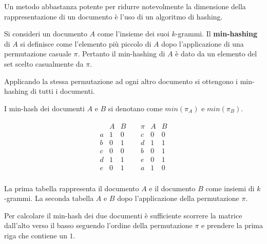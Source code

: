 		Un metodo abbastanza potente per ridurre notevolmente la dimensione della rappresentazione di un documento è l'uso di un algoritmo di hashing.

		Si consideri un documento $A$ come l'insieme dei suoi $k$-grammi. Il \textbf{min-hashing} di $A$ si definisce come l'elemento più piccolo di $A$ dopo l'applicazione di una permutazione casuale $\pi$. Pertanto il min-hashing di $A$ è dato da un elemento del set scelto casualmente da $\pi$. 

		Applicando la stessa permutazione ad ogni altro documento si ottengono i min-hashing di tutti i documenti.

		\clearpage

		\begin{remark}
			I min-hash dei documenti $A$ e $B$ si denotano come $min(\pi_A)$ e $min(\pi_B)$.
		\end{remark}

		\begin{example}\label{ex:pi_perm}
		$$
		\begin{array}{ccc}
			\begin{array}{ccc}
			& A & B \\ \hline
			a & 1 & 0 \\
			b & 0 & 1 \\
			c & 0 & 0 \\
			d & 1 & 1 \\
			e & 0 & 1 \\
			\end{array}
			\ & \
			\begin{array}{ccc}
			\pi & A & B \\ \hline
			c & 0 & 0 \\
			d & 1 & 1 \\
			b & 0 & 1 \\
			e & 0 & 1 \\
			a & 1 & 0 \\
			\end{array}
		\end{array}
		$$

		La prima tabella rappresenta il documento $A$ e il documento $B$ come insiemi di $k$-grammi. La seconda tabella $A$ e $B$ dopo l'applicazione della permutazione $\pi$.
		\end{example}

		Per calcolare il min-hash dei due documenti è sufficiente scorrere la matrice dall'alto verso il basso seguendo l'ordine della permutazione $\pi$ e prendere la prima riga che contiene un $1$.


